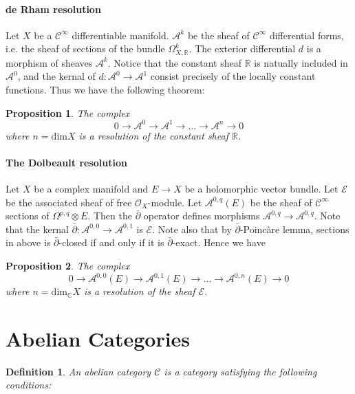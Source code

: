 \documentclass{article}
\numberwithin{equation}{subsection} %
\newtheorem{defi}{Definition}[section]
\newtheorem{prop}{Proposition}[section]
\theoremstyle{definition}
\begin{document}
\paragraph{de Rham resolution}
    
Let $X$ be a $ \mathcal{C}^{\infty}$ differentiable manifold.
$ \mathcal{A}^k$ be the sheaf of $ \mathcal{C}^{\infty}$ differential
forms, i.e. the sheaf of sections of the bundle $\Omega^k_{X,\mathbb{R}}$. 
The exterior differential $d$ is a morphism of sheaves $ \mathcal{A}^k$.
Notice that the constant sheaf $ \mathbb{R}$ is natually included in
$ \mathcal{A}^0$, and the kernal of $d:\mathcal{A}^0\to \mathcal{A}^1$
consist precisely of the locally constant functions. Thus we have the
following theorem:

\begin{prop}
    The complex
    $$ 0\to \mathcal{A}^0\to \mathcal{A}^1\to \text{...}\to \mathcal{A}^n\to 0$$
    where $n=\text{dim}X$ is a resolution of the constant sheaf $ \mathbb{R}$.
\end{prop}

\paragraph{The Dolbeault resolution}

Let $X$ be a complex manifold and $E\to X$ be a holomorphic vector bundle.
Let $ \mathcal{E}$ be the associated sheaf of free $ \mathcal{O}_X$-module.
Let $ \mathcal{A}^{0,q}(E)$ be the sheaf of $ \mathcal{C}^{\infty}$ sections
of $\Omega^{p,q} \otimes E$. Then the $\bar{\partial}$ operator defines
morphisms $ \mathcal{A}^{0,q}\to \mathcal{A}^{0,q}$. Note that the kernal
$ \bar{\partial} :\mathcal{A}^{0,0}\to \mathcal{A}^{0,1}$
is $ \mathcal{E}$. Note also that by $\bar{\partial}$-Poinc\`{a}re lemma,
sections in above is $\bar{\partial}$-closed if and only if it is
$\bar{\partial}$-exact. Hence we have

\begin{prop}
    The complex
    $$ 0\to \mathcal{A}^{0,0}(E)\to \mathcal{A}^{0,1}(E)\to \text{...}\to \mathcal{A}^{0,n}(E)\to 0 $$
    where $n=\text{dim}_{ \mathbb{C}} X$ is a resolution of the sheaf $ \mathcal{E}$.
\end{prop}

\section{Abelian Categories}

\begin{defi}
    An abelian category $\mathcal{C}$ is a category satisfying the following
    conditions:
\end{defi}
\end{document}
